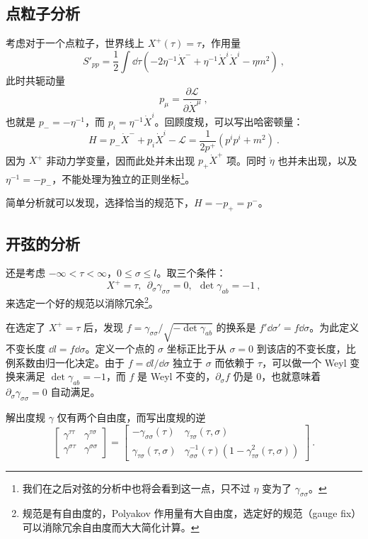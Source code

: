 \subsection{点粒子分析}
考虑对于一个点粒子，世界线上 $X^+(\tau) = \tau$，作用量 
\begin{equation}
	S'_{pp} = \frac{1}{2} \int \dd \tau \left(-2 \eta^{-1} \dot X^- + \eta^{-1} \dot X^i \dot X^i - \eta m^2\right) ~,
\end{equation}
此时共轭动量
\begin{equation}
	p_\mu = \frac{\partial \mathcal L}{\partial \dot X^\mu} ~,
\end{equation}
也就是 $p_- = -\eta^{-1}$，而 $p_i = \eta^{-1} \dot X^i$。回顾度规，可以写出哈密顿量：
\begin{equation}
	H = p_- \dot X^- + p_i \dot X^i - \mathcal L = \frac{1}{2 p^+} (p^i p^i + m^2) ~.
\end{equation}
因为 $X^+$ 非动力学变量，因而此处并未出现 $p_+ \dot X^+$ 项。同时 $\dot\eta$ 也并未出现，以及 $\eta^{-1} = - p_-$，不能处理为独立的正则坐标\footnote{我们在之后对弦的分析中也将会看到这一点，只不过 $\eta$ 变为了 $\gamma_{\sigma \sigma}$。}。

简单分析就可以发现，选择恰当的规范下，$H = -p_+ = p^-$。

\subsection{开弦的分析}
还是考虑 $-\infty < \tau < \infty$，$0 \le\sigma \le l$。取三个条件：
\begin{equation}
	X^+ = \tau,~~  \partial_\sigma \gamma_{\sigma \sigma} = 0, ~~\det\gamma_{ab} = -1 ~,
\end{equation}
来选定一个好的规范以消除冗余\footnote{规范是有自由度的，Polyakov 作用量有大自由度，选定好的规范（gauge fix）可以消除冗余自由度而大大简化计算。}。

在选定了 $X^+ = \tau$ 后，发现 $f = \gamma_{\sigma \sigma}/\sqrt{-\det \gamma_{ab}}$ 的换系是 $f' \dd \sigma' = f \dd \sigma$。为此定义不变长度 $\dd l = f \dd \sigma$。定义一个点的 $\sigma$ 坐标正比于从 $\sigma = 0$ 到该店的不变长度，比例系数由归一化决定。由于 $f = \dd l / \dd \sigma$ 独立于 $\sigma$ 而依赖于 $\tau$，可以做一个 Weyl 变换来满足 $\det \gamma_{ab} = -1$，而 $f$ 是 Weyl 不变的，$\partial_\sigma f$ 仍是 $0$，也就意味着 $\partial_\sigma \gamma_{\sigma \sigma}=0$ 自动满足。

解出度规 $\gamma$ 仅有两个自由度，而写出度规的逆 
\begin{equation}
	\left[\begin{matrix}
		\gamma^{\tau\tau} & \gamma^{\tau\sigma} \\
		\gamma^{\sigma \tau} & \gamma^{\sigma \sigma }
	\end{matrix}\right] = \left[\begin{matrix}
		-\gamma_{\sigma \sigma}(\tau) & \gamma_{\tau \sigma}(\tau, \sigma) \\
		\gamma_{\tau \sigma}(\tau, \sigma) & \gamma_{\sigma\sigma}^{-1}(\tau)(1 - \gamma_{\tau \sigma}^2(\tau, \sigma))
	\end{matrix}\right] ~.
\end{equation}


